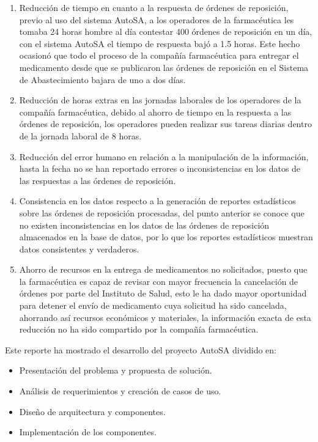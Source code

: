 \begin{enumerate}
	\item Reducción de tiempo en cuanto a la respuesta de órdenes de reposición, previo al uso del sistema AutoSA, a los operadores de la farmacéutica les tomaba 24 horas hombre al día contestar 400 órdenes de reposición en un día, con el sistema AutoSA el tiempo de respuesta bajó a 1.5 horas. Este hecho ocasionó que todo el proceso de la compañía farmacéutica para entregar el medicamento desde que se publicaron las órdenes de reposición en el Sistema de Abastecimiento bajara de uno a dos días.
	\item Reducción de horas extras en las jornadas laborales de los operadores de la compañía farmacéutica, debido al ahorro de tiempo en la respuesta a las órdenes de reposición, los operadores pueden realizar sus tareas diarias dentro de la jornada laboral de 8 horas.
	\item Reducción del error humano en relación a la manipulación de la información, hasta la fecha no se han reportado errores o inconsistencias en los datos de las respuestas a las órdenes de reposición.
	\item Consistencia en los datos respecto a la generación de reportes estadísticos sobre las órdenes de reposición procesadas, del punto anterior se conoce que no existen inconsistencias en los datos de las órdenes de reposición almacenados en la base de datos, por lo que los reportes estadísticos muestran datos consistentes y verdaderos.
	\item Ahorro de recursos en la entrega de medicamentos no solicitados, puesto que la farmacéutica es capaz de revisar con mayor frecuencia la cancelación de órdenes por parte del Instituto de Salud, esto le ha dado mayor oportunidad para detener el envío de medicamento cuya solicitud ha sido cancelada, ahorrando así recursos económicos y materiales, la información exacta de esta reducción no ha sido compartido por la compañía farmacéutica.
\end{enumerate}
Este reporte ha mostrado el desarrollo del proyecto AutoSA dividido en:
\begin{itemize}
	\item Presentación del problema y propuesta de solución. 
	\item Análisis de requerimientos y creación de casos de uso.
	\item Diseño de arquitectura y componentes.
	\item Implementación de los componentes.
\end{itemize}

